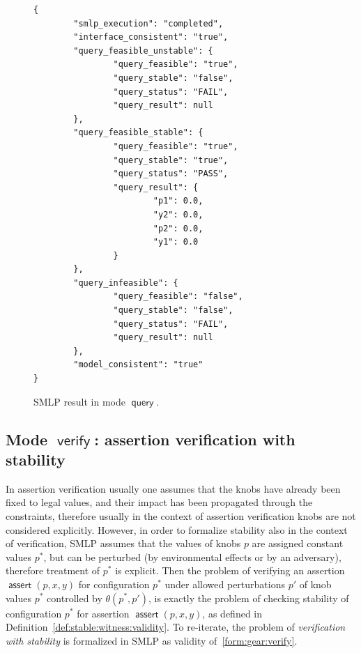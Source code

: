 \documentclass[a4paper,parskip=half]{article} %
\newcommand*\assert{\operatorname{\mathsf{assert}}}
\newcommand*\mode[1]{\operatorname{\mathsf{#1}}} %
\begin{document}
\begin{figure}[tp]%
\small
\begin{verbatim}
{
        "smlp_execution": "completed",
        "interface_consistent": "true",
        "query_feasible_unstable": {
                "query_feasible": "true",
                "query_stable": "false",
                "query_status": "FAIL",
                "query_result": null
        },
        "query_feasible_stable": {
                "query_feasible": "true",
                "query_stable": "true",
                "query_status": "PASS",
                "query_result": {
                        "p1": 0.0,
                        "y2": 0.0,
                        "p2": 0.0,
                        "y1": 0.0
                }
        },
        "query_infeasible": {
                "query_feasible": "false",
                "query_stable": "false",
                "query_status": "FAIL",
                "query_result": null
        },
        "model_consistent": "true"
}
\end{verbatim}
\caption{SMLP result in mode $\mode{query}$.}
\label{fig:query:result}
\end{figure}

\subsection{Mode $\mode{verify}$: assertion verification with stability}\label{sect:verify}


In assertion verification usually one assumes that the knobs have already been fixed to legal values, 
and their impact has been propagated through the constraints, therefore usually in the context of assertion 
verification knobs are not considered explicitly. However, in order to formalize stability also in the context of 
verification, SMLP assumes that the values of knobs $p$ are assigned constant values $p^*$, but can be 
perturbed (by environmental effects or by an adversary), therefore treatment of $p^*$ is explicit. Then the problem of 
verifying an assertion $\assert(p,x,y)$ for configuration $p^*$ under allowed perturbations $p'$ of knob values $p^*$ 
controlled by $\theta(p^*, p')$, is exactly the problem of checking stability of configuration $p^*$ for assertion 
$\assert(p,x,y)$, as defined in Definition~\ref{def:stable:witness:validity}. To re-iterate, the problem of 
\emph{verification with stability} is formalized in SMLP as validity of~\cref{form:gear:verify}.
\end{document}
